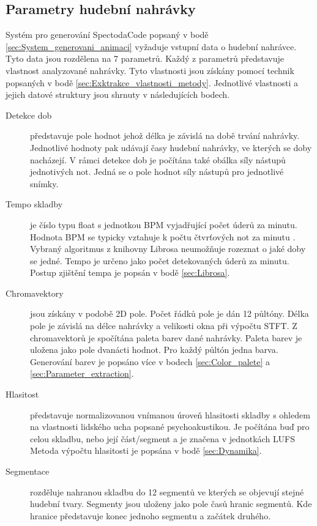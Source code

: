 \subsection{Parametry hudební nahrávky} \label{sec:Parametry_nahravky}

Systém pro generování SpectodaCode popsaný v bodě \ref{sec:System_generovani_animaci} vyžaduje vstupní data o hudební nahrávce. Tyto data jsou rozdělena na 7 parametrů. Každý z parametrů představuje vlastnost analyzované nahrávky. Tyto vlastnosti jsou získány pomocí technik popsaných v bodě \ref{sec:Exktrakce_vlastnosti_metody}. Jednotlivé vlastnosti a jejich datové struktury jsou shrnuty v následujících bodech.

\begin{description}
    \item[Detekce dob] představuje pole hodnot jehož délka je závislá na době trvání nahrávky. Jednotlivé hodnoty pak udávají časy hudební nahrávky, ve kterých se doby nacházejí. V rámci detekce dob je počítána také obálka síly nástupů jednotivých not. Jedná se o pole hodnot síly nástupů pro jednotlivé snímky. 
    
    \item[Tempo skladby] je číslo typu float s jednotkou \acs{BPM} vyjadřující počet úderů za minutu. Hodnota BPM se typicky vztahuje k počtu čtvrťových not za minutu \cite{Harvard_dictionary_of_music}. Vybraný algoritmus z knihovny Librosa neumožňuje rozeznat o jaké doby se jedné. Tempo je určeno jako počet detekovaných úderů za minutu. Postup zjištění tempa je popsán v bodě \ref{sec:Librosa}.

    \item[Chromavektory] jsou získány v podobě 2D pole. Počet řádků pole je dán 12 půltóny. Délka pole je závislá na délce nahrávky a velikosti okna při výpočtu \acs{STFT}. Z chromavektorů je spočítána paleta barev dané nahrávky. Paleta barev je uložena jako pole dvanácti hodnot. Pro každý půltón jedna barva. Generování barev je popsáno více v bodech \ref{sec:Color_palete} a \ref{sec:Parameter_extraction}.

    \item[Hlasitost] představuje normalizovanou vnímanou úroveň hlasitosti skladby s ohledem na vlastnosti lidského ucha popsané psychoakustikou. Je počítána buď pro celou skladbu, nebo její část/segment a je značena v jednotkách \acs{LUFS} Metoda výpočtu hlasitosti je popsána v bodě \ref{sec:Dynamika}.

    \item[Segmentace] rozděluje nahranou skladbu do 12 segmentů ve kterých se objevují stejné hudební tvary. Segmenty jsou uloženy jako pole časů hranic segmentů. Kde hranice představuje konec jednoho segmentu a začátek druhého. 


\end{description}
